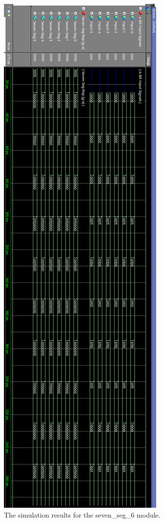 \documentclass[a4paper]{article}
\begin{document}
\begin{figure}[h]
\centering
\includegraphics[height=.98\textheight]{functional_units/seven_seg_6/seven_seg_6_sim.png}
\caption{The simulation results for the seven\_seg\_6 module.}
\end{figure}
\clearpage
\end{document}
